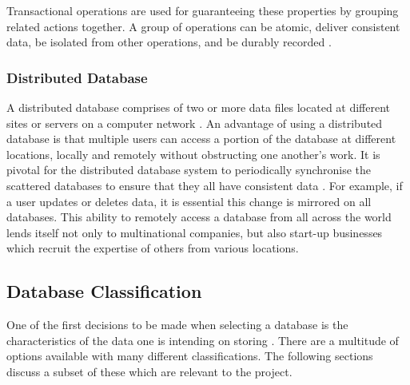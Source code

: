 Transactional operations are used for guaranteeing these properties by grouping related actions together. A group of operations can be atomic, deliver consistent data, be isolated from other operations, and be durably recorded \cite{acidtrans}.

\subsubsection{Distributed Database}\label{distributeddb}
A distributed database comprises of two or more data files located at different sites or servers on a computer network \cite{dd}. An advantage of using a distributed database is that multiple users can access a portion of the database at different locations, locally and remotely without obstructing one another's work. It is pivotal for the distributed database system to periodically synchronise the scattered databases to ensure that they all have consistent data \cite{dd}. For example, if a user updates or deletes data, it is essential this change is mirrored on all databases. This ability to remotely access a database from all across the world lends itself not only to multinational companies, but also start-up businesses which recruit the expertise of others from various locations.

\subsection{Database Classification}\label{dbclass}
One of the first decisions to be made when selecting a database is the characteristics of the data one is intending on storing \cite{nosql2}. There are a multitude of options available with many different classifications. The following sections discuss a subset of these which are relevant to the project.

